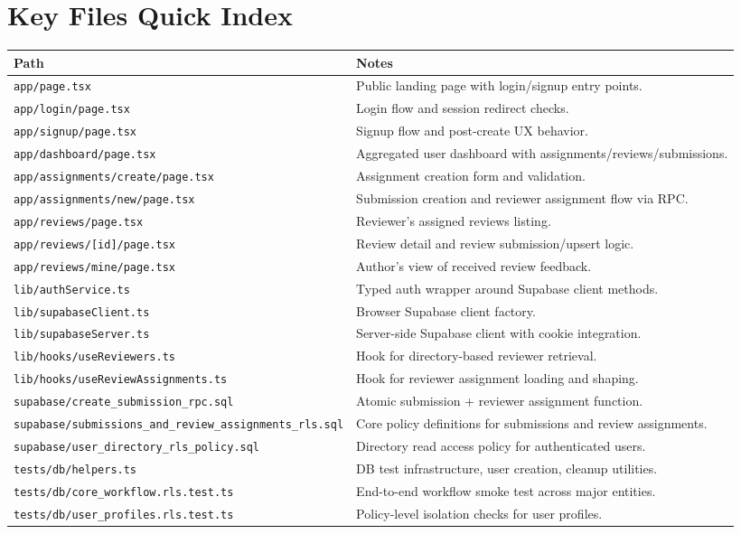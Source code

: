 \documentclass[11pt]{article}
\begin{document}
\section{Key Files Quick Index}
\begin{longtable}{>{\ttfamily}p{} p{}}
\toprule
Path & Notes \\
\midrule
\textnormal{\texttt{app/page.tsx}} & Public landing page with login/signup entry points. \\
\textnormal{\texttt{app/login/page.tsx}} & Login flow and session redirect checks. \\
\textnormal{\texttt{app/signup/page.tsx}} & Signup flow and post-create UX behavior. \\
\textnormal{\texttt{app/dashboard/page.tsx}} & Aggregated user dashboard with assignments/reviews/submissions. \\
\textnormal{\texttt{app/assignments/create/page.tsx}} & Assignment creation form and validation. \\
\textnormal{\texttt{app/assignments/new/page.tsx}} & Submission creation and reviewer assignment flow via RPC. \\
\textnormal{\texttt{app/reviews/page.tsx}} & Reviewer's assigned reviews listing. \\
\textnormal{\texttt{app/reviews/[id]/page.tsx}} & Review detail and review submission/upsert logic. \\
\textnormal{\texttt{app/reviews/mine/page.tsx}} & Author's view of received review feedback. \\
\textnormal{\texttt{lib/authService.ts}} & Typed auth wrapper around Supabase client methods. \\
\textnormal{\texttt{lib/supabaseClient.ts}} & Browser Supabase client factory. \\
\textnormal{\texttt{lib/supabaseServer.ts}} & Server-side Supabase client with cookie integration. \\
\textnormal{\texttt{lib/hooks/useReviewers.ts}} & Hook for directory-based reviewer retrieval. \\
\textnormal{\texttt{lib/hooks/useReviewAssignments.ts}} & Hook for reviewer assignment loading and shaping. \\
\textnormal{\texttt{supabase/create\_submission\_rpc.sql}} & Atomic submission + reviewer assignment function. \\
\textnormal{\texttt{supabase/submissions\_and\_review\_assignments\_rls.sql}} & Core policy definitions for submissions and review assignments. \\
\textnormal{\texttt{supabase/user\_directory\_rls\_policy.sql}} & Directory read access policy for authenticated users. \\
\textnormal{\texttt{tests/db/helpers.ts}} & DB test infrastructure, user creation, cleanup utilities. \\
\textnormal{\texttt{tests/db/core\_workflow.rls.test.ts}} & End-to-end workflow smoke test across major entities. \\
\textnormal{\texttt{tests/db/user\_profiles.rls.test.ts}} & Policy-level isolation checks for user profiles. \\
\bottomrule
\end{longtable}
\end{document}
